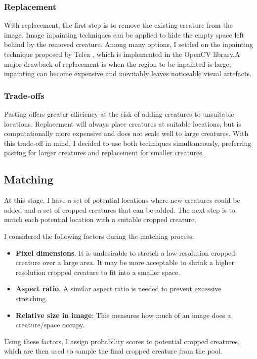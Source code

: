 \documentclass[12pt,a4paper,twoside,openright]{report}
\begin{document}
\subsubsection{Replacement}
With replacement, the first step is to remove the existing creature from the image. Image inpainting techniques can be applied to hide the empty space left behind by the removed creature. Among many options, I settled on the inpainting technique proposed by Telea \cite{telea_image_2004}, which is implemented in the OpenCV library.A major drawback of replacement is when the region to be inpainted is large, inpainting can become expensive and inevitably leaves noticeable visual artefacts. 

\subsubsection{Trade-offs}
Pasting offers greater efficiency at the risk of adding creatures to unsuitable locations. Replacement will always place creatures at suitable locations, but is computationally more expensive and does not scale well to large creatures. With this trade-off in mind, I decided to use both techniques simultaneously, preferring pasting for larger creatures and replacement for smaller creatures.

\subsection{Matching}
At this stage, I have a set of potential locations where new creatures could be added and a set of cropped creatures that can be added. The next step is to match each potential location with a suitable cropped creature.

I considered the following factors during the matching process:
\begin{itemize}
    \item \textbf{Pixel dimensions}. It is undesirable to stretch a low resolution cropped creature over a large area. It may be more acceptable to shrink a higher resolution cropped creature to fit into a smaller space.
    \item \textbf{Aspect ratio}. A similar aspect ratio is needed to prevent excessive stretching.
    \item \textbf{Relative size in image}: This measures how much of an image does a creature/space occupy. 
\end{itemize}

Using these factors, I assign probability scores to potential cropped creatures, which are then used to sample the final cropped creature from the pool.
\end{document}
